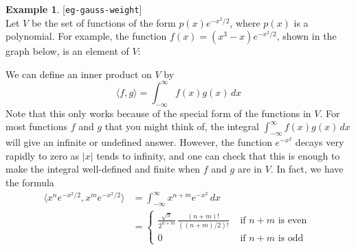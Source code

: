 \documentclass{amsart}
\newcommand{\lbl}[1]{\label{#1}\textup{[\texttt{#1}]}\ \\}
\newcommand{\lbl}{\label}
\newcommand{\ip}[1]     {\langle #1\rangle}
\renewcommand{\:}       {\colon}
\theoremstyle{definition}
\newtheorem{example}[theorem]{Example}
\begin{document}
\begin{example}\lbl{eg-gauss-weight}
 Let $V$ be the set of functions of the form
 $p(x)e^{-x^2/2}$, where $p(x)$ is a polynomial.  For
 example, the function $f(x)=(x^3-x)e^{-x^2/2}$, shown in
 the graph below, is an element of $V$:
 \begin{center}
 \end{center} 
 We can define an inner product on $V$ by
 \[ \ip{f,g} = \int_{-\infty}^\infty f(x)g(x)\,dx \]
 Note that this only works because of the special form of
 the functions in $V$.  For most functions $f$ and $g$ that
 you might think of, the integral
 $\int_{-\infty}^\infty f(x)g(x)\,dx$ will give an infinite
 or undefined answer.  However, the function $e^{-x^2}$
 decays very rapidly to zero as $|x|$ tends to infinity, and one
 can check that this is enough to make the integral
 well-defined and finite when $f$ and $g$ are in $V$.  In
 fact, we have the formula
 \begin{align*}
  \ip{x^ne^{-x^2/2},x^me^{-x^2/2}} &= 
    \int_{-\infty}^\infty x^{n+m} e^{-x^2}\,dx \\
   &= 
    \begin{cases}
     \frac{\sqrt{\pi}}{2^{n+m}} \,\frac{(n+m)!}{((n+m)/2)!} &
      \text{ if $n+m$ is even } \\
     0 & \text{ if $n+m$ is odd }
    \end{cases}
 \end{align*}
\end{example}

\end{document}
